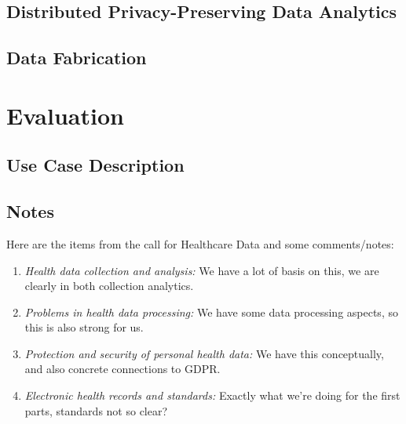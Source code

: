 \subsection{Distributed Privacy-Preserving Data Analytics}
\label{sec:dataanalysis}

\subsection{Data Fabrication}
\label{sec:datafabrication}

\section{Evaluation}

\subsection{Use Case Description}
\label{usecase}





\subsection*{Notes}

Here are the items from the call for Healthcare Data and some comments/notes:
\begin{enumerate}
\item 
\emph{Health data collection and analysis:}
We have a lot of basis on this, we are clearly in both collection analytics.

\item 
\emph{Problems in health data processing:}
We have some data processing aspects, so this is also strong for us.

\item 
\emph{Protection and security of personal health data:}
We have this conceptually, and also concrete connections to GDPR.

\item 
\emph{Electronic health records and standards:}
Exactly what we're doing for the first parts, standards not so clear?
\end{enumerate}



